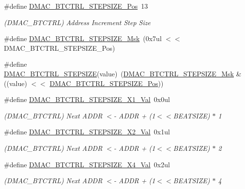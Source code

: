\begin{DoxyCompactItemize}
\item 
\#define \mbox{\hyperlink{group___s_a_m_d21___d_m_a_c_gacf7558693207543fbd9048f7f76fa238}{D\+M\+A\+C\+\_\+\+B\+T\+C\+T\+R\+L\+\_\+\+S\+T\+E\+P\+S\+I\+Z\+E\+\_\+\+Pos}}~13
\begin{DoxyCompactList}\small\item\em (D\+M\+A\+C\+\_\+\+B\+T\+C\+T\+RL) Address Increment Step Size \end{DoxyCompactList}\item 
\#define \mbox{\hyperlink{group___s_a_m_d21___d_m_a_c_ga3b36dfe09a581a4f545b8ecfb7add11e}{D\+M\+A\+C\+\_\+\+B\+T\+C\+T\+R\+L\+\_\+\+S\+T\+E\+P\+S\+I\+Z\+E\+\_\+\+Msk}}~(0x7ul $<$$<$ D\+M\+A\+C\+\_\+\+B\+T\+C\+T\+R\+L\+\_\+\+S\+T\+E\+P\+S\+I\+Z\+E\+\_\+\+Pos)
\item 
\#define \mbox{\hyperlink{group___s_a_m_d21___d_m_a_c_ga10aaa3d3c6a9119796e8f7bbe61c90d5}{D\+M\+A\+C\+\_\+\+B\+T\+C\+T\+R\+L\+\_\+\+S\+T\+E\+P\+S\+I\+ZE}}(value)~(\mbox{\hyperlink{group___s_a_m_d21___d_m_a_c_ga3b36dfe09a581a4f545b8ecfb7add11e}{D\+M\+A\+C\+\_\+\+B\+T\+C\+T\+R\+L\+\_\+\+S\+T\+E\+P\+S\+I\+Z\+E\+\_\+\+Msk}} \& ((value) $<$$<$ \mbox{\hyperlink{group___s_a_m_d21___d_m_a_c_gacf7558693207543fbd9048f7f76fa238}{D\+M\+A\+C\+\_\+\+B\+T\+C\+T\+R\+L\+\_\+\+S\+T\+E\+P\+S\+I\+Z\+E\+\_\+\+Pos}}))
\item 
\#define \mbox{\hyperlink{group___s_a_m_d21___d_m_a_c_gaa089586d04726d1fe2a2b572764d51e3}{D\+M\+A\+C\+\_\+\+B\+T\+C\+T\+R\+L\+\_\+\+S\+T\+E\+P\+S\+I\+Z\+E\+\_\+\+X1\+\_\+\+Val}}~0x0ul
\begin{DoxyCompactList}\small\item\em (D\+M\+A\+C\+\_\+\+B\+T\+C\+T\+RL) Next A\+D\+DR $<$-\/ A\+D\+DR + (1$<$$<$B\+E\+A\+T\+S\+I\+ZE) $\ast$ 1 \end{DoxyCompactList}\item 
\#define \mbox{\hyperlink{group___s_a_m_d21___d_m_a_c_ga80329ffceb6b9a1a59101ebf1311e4df}{D\+M\+A\+C\+\_\+\+B\+T\+C\+T\+R\+L\+\_\+\+S\+T\+E\+P\+S\+I\+Z\+E\+\_\+\+X2\+\_\+\+Val}}~0x1ul
\begin{DoxyCompactList}\small\item\em (D\+M\+A\+C\+\_\+\+B\+T\+C\+T\+RL) Next A\+D\+DR $<$-\/ A\+D\+DR + (1$<$$<$B\+E\+A\+T\+S\+I\+ZE) $\ast$ 2 \end{DoxyCompactList}\item 
\#define \mbox{\hyperlink{group___s_a_m_d21___d_m_a_c_ga0ec2b4b8e13fa2dcc7076d99e5b0ce36}{D\+M\+A\+C\+\_\+\+B\+T\+C\+T\+R\+L\+\_\+\+S\+T\+E\+P\+S\+I\+Z\+E\+\_\+\+X4\+\_\+\+Val}}~0x2ul
\begin{DoxyCompactList}\small\item\em (D\+M\+A\+C\+\_\+\+B\+T\+C\+T\+RL) Next A\+D\+DR $<$-\/ A\+D\+DR + (1$<$$<$B\+E\+A\+T\+S\+I\+ZE) $\ast$ 4 \end{DoxyCompactList}\item 

\end{DoxyCompactItemize}

